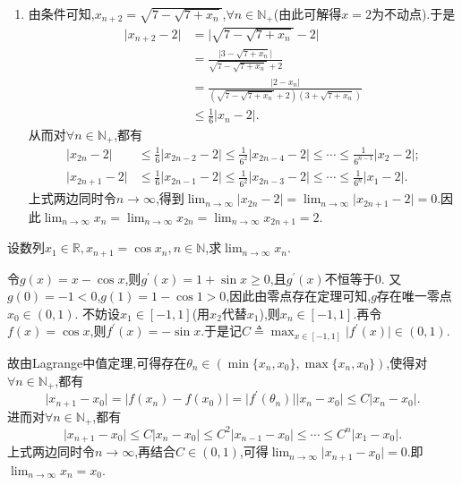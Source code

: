 \documentclass[lang=cn,newtx,10pt,scheme=chinese]{elegantbook}
\begin{document}
\begin{solution}
\begin{enumerate}
\item 由条件可知,\(x_{n + 2}=\sqrt{7-\sqrt{7 + x_n}}\),\(\forall n\in\mathbb{N}_+\)(由此可解得\(x = 2\)为不动点).于是
\begin{align*}
\vert x_{n + 2}-2\vert&=\vert\sqrt{7-\sqrt{7 + x_n}}-2\vert\\
&=\frac{\vert 3-\sqrt{7 + x_n}\vert}{\sqrt{7-\sqrt{7 + x_n}}+2}\\
&=\frac{\vert 2 - x_n\vert}{(\sqrt{7-\sqrt{7 + x_n}}+2)(3+\sqrt{7 + x_n})}\\
&\leqslant\frac{1}{6}\vert x_n - 2\vert.
\end{align*}
从而对$\forall n \in \mathbb{N}_+$,都有
\begin{align*}
\vert x_{2n}-2\vert&\leqslant\frac{1}{6}\vert x_{2n - 2}-2\vert\leqslant\frac{1}{6^2}\vert x_{2n - 4}-2\vert\leqslant\cdots\leqslant\frac{1}{6^{n - 1}}\vert x_2 - 2\vert;\\
\vert x_{2n + 1}-2\vert&\leqslant\frac{1}{6}\vert x_{2n - 1}-2\vert\leqslant\frac{1}{6^2}\vert x_{2n - 3}-2\vert\leqslant\cdots\leqslant\frac{1}{6^n}\vert x_1 - 2\vert.
\end{align*}
上式两边同时令\(n\rightarrow\infty\),得到\(\lim_{n\rightarrow\infty}\vert x_{2n}-2\vert=\lim_{n\rightarrow\infty}\vert x_{2n + 1}-2\vert = 0\).因此\(\lim_{n\rightarrow\infty}x_n=\lim_{n\rightarrow\infty}x_{2n}=\lim_{n\rightarrow\infty}x_{2n + 1}=2\).
\end{enumerate}
\end{solution}

\begin{example}
   设数列\(x_1\in\mathbb{R},x_{n + 1} = \cos x_n,n\in\mathbb{N}\),求\(\lim_{n \to \infty} x_n\).
\end{example}
\begin{solution}
   令\(g(x)=x - \cos x\),则\(g^\prime(x)=1 + \sin x\geqslant0\),且\(g^\prime(x)\)不恒等于\(0\).
又\(g(0)= -1 < 0\),\(g(1)=1 - \cos 1 > 0\),因此由零点存在定理可知,\(g\)存在唯一零点\(x_0\in(0,1)\).
不妨设\(x_1\in[-1,1]\)(用\(x_2\)代替\(x_1\)),则\(x_n\in[-1,1]\).再令\(f(x)=\cos x\),则\(f^\prime(x)=-\sin x\).于是记\(C\triangleq \max_{x\in[-1,1]}\vert f^\prime(x)\vert\in(0,1)\).

故由Lagrange中值定理,可得存在\(\theta_n\in(\min\{x_n,x_0\},\max\{x_n,x_0\})\),使得对\(\forall n\in\mathbb{N}_+\),都有
\[
\vert x_{n + 1}-x_0\vert=\vert f(x_n)-f(x_0)\vert=\vert f^\prime(\theta_n)\vert\vert x_n - x_0\vert\leqslant C\vert x_n - x_0\vert.
\]
进而对\(\forall n\in\mathbb{N}_+\),都有
\[
\vert x_{n + 1}-x_0\vert\leqslant C\vert x_n - x_0\vert\leqslant C^2\vert x_{n - 1}-x_0\vert\leqslant\cdots\leqslant C^n\vert x_1 - x_0\vert.
\]
上式两边同时令\(n\rightarrow\infty\),再结合\(C\in(0,1)\),可得\(\lim_{n\rightarrow\infty}\vert x_{n + 1}-x_0\vert = 0\).即\(\lim_{n\rightarrow\infty}x_n = x_0\).
\end{solution}
\end{document}
